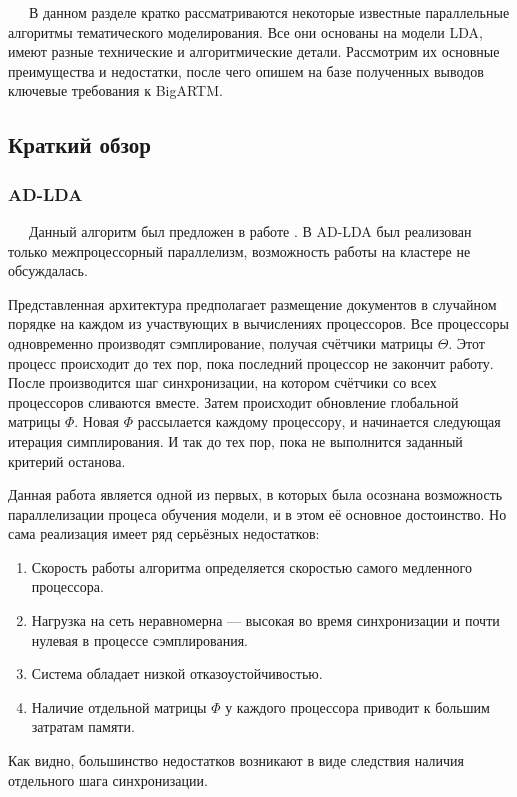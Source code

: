
$\quad\;\:$В данном разделе кратко рассматриваются некоторые известные параллельные алгоритмы тематического моделирования. Все они основаны на модели LDA, имеют разные технические и алгоритмические детали. Рассмотрим их основные преимущества и недостатки, после чего опишем на базе полученных выводов ключевые требования к BigARTM. 

\subsection{Краткий обзор}

\subsubsection{AD-LDA}
$\quad\;\:$Данный алгоритм был предложен в работе \cite{ad_lda}. В AD-LDA был реализован только межпроцессорный параллелизм, возможность работы на кластере не обсуждалась. 

Представленная архитектура предполагает размещение документов в случайном порядке на каждом из участвующих в вычислениях процессоров. Все процессоры одновременно производят сэмплирование, получая счётчики матрицы $\Theta$. Этот процесс происходит до тех пор, пока последний процессор не закончит работу. После производится шаг синхронизации, на котором счётчики со всех процессоров сливаются вместе. Затем происходит обновление глобальной матрицы $\Phi$. Новая $\Phi$ рассылается каждому процессору, и начинается следующая итерация симплирования. И так до тех пор, пока не выполнится заданный критерий останова.

Данная работа является одной из первых, в которых была осознана возможность параллелизации процеса обучения модели, и в этом её основное достоинство. Но сама реализация имеет ряд серьёзных недостатков:

\begin{enumerate}
	\item Скорость работы алгоритма определяется скоростью самого медленного процессора.
	\item Нагрузка на сеть неравномерна --- высокая во время синхронизации и почти нулевая в процессе сэмплирования. 
	\item Система обладает низкой отказоустойчивостью.
	\item Наличие отдельной матрицы $\Phi$ у каждого процессора приводит к большим затратам памяти.
\end{enumerate}

Как видно, большинство недостатков возникают в виде следствия наличия отдельного шага синхронизации.

